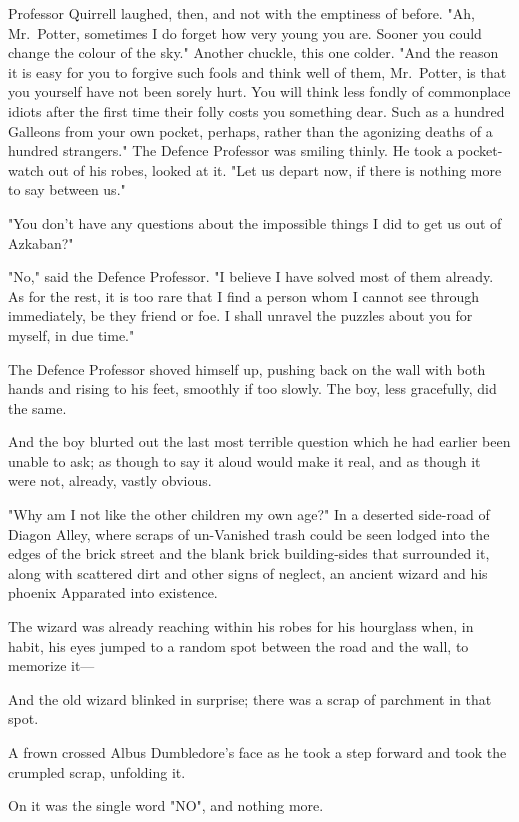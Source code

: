 Professor Quirrell laughed, then, and not with the emptiness of before. "Ah,
Mr.~Potter, sometimes I do forget how very young you are. Sooner you could
change the colour of the sky." Another chuckle, this one colder. "And the reason
it is easy for you to forgive such fools and think well of them, Mr.~Potter, is
that you yourself have not been sorely hurt. You will think less fondly of
commonplace idiots after the first time their folly costs you something dear.
Such as a hundred Galleons from your own pocket, perhaps, rather than the
agonizing deaths of a hundred strangers." The Defence Professor was smiling
thinly. He took a pocket-watch out of his robes, looked at it. "Let us depart
now, if there is nothing more to say between us."

"You don't have any questions about the impossible things I did to get us out
of Azkaban?"

"No," said the Defence Professor. "I believe I have solved most of them
already. As for the rest, it is too rare that I find a person whom I cannot see
through immediately, be they friend or foe. I shall unravel the puzzles about
you for myself, in due time."

The Defence Professor shoved himself up, pushing back on the wall with both
hands and rising to his feet, smoothly if too slowly. The boy, less gracefully,
did the same.

And the boy blurted out the last most terrible question which he had earlier
been unable to ask; as though to say it aloud would make it real, and as though
it were not, already, vastly obvious.

"Why am I not like the other children my own age?"
\later
In a deserted side-road of Diagon Alley, where scraps of un-Vanished trash
could be seen lodged into the edges of the brick street and the blank brick
building-sides that surrounded it, along with scattered dirt and other signs of
neglect, an ancient wizard and his phoenix Apparated into existence.

The wizard was already reaching within his robes for his hourglass when, in
habit, his eyes jumped to a random spot between the road and the wall, to
memorize it---

And the old wizard blinked in surprise; there was a scrap of parchment in that
spot.

A frown crossed Albus Dumbledore's face as he took a step forward and took the
crumpled scrap, unfolding it.

On it was the single word "NO", and nothing more.

